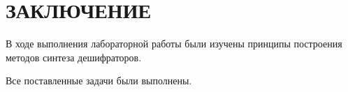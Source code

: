 \chapter*{ЗАКЛЮЧЕНИЕ}

В ходе выполнения лабораторной работы были изучены принципы построения методов синтеза дешифраторов.

Все поставленные задачи были выполнены.